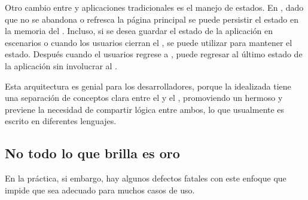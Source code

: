 


Otro cambio entre \spa y aplicaciones \webINT tradicionales es el manejo de estados. En \spa, dado que no se abandona o refresca la página \webINT principal se puede persistir el estado en la memoria del \browserINT. Incluso, si se desea guardar el estado de la aplicación en escenarios \offline o cuando los usuarios cierran el \browserINT, se puede utilizar \htmlfive \storage para mantener el estado. Después cuando el usuarios regrese a \online, puede regresar al último estado de la aplicación sin involucrar al \serverAS.

Esta arquitectura es genial para los desarrolladores, porque la idealizada \singlePageAppINT tiene una separación de conceptos clara entre el \clientAS y el \serverAS, promoviendo un hermoso \workflowCPT y previene la necesidad de compartir lógica entre ambos, lo que usualmente es escrito en diferentes lenguajes.

\subsection{No todo lo que brilla es oro}

En la práctica, si embargo, hay algunos defectos fatales con este enfoque que impide que sea adecuado para muchos casos de uso.


